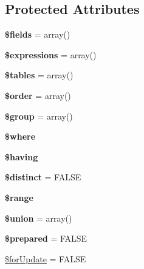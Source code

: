 \subsection*{Protected Attributes}
\begin{DoxyCompactItemize}
\item 
\hypertarget{classSelectQuery_acf123c393af607a777168473e9f4cbcc}{
{\bfseries \$fields} = array()}
\label{classSelectQuery_acf123c393af607a777168473e9f4cbcc}

\item 
\hypertarget{classSelectQuery_ab763e3db3e95a5d2fbea64544b630eac}{
{\bfseries \$expressions} = array()}
\label{classSelectQuery_ab763e3db3e95a5d2fbea64544b630eac}

\item 
\hypertarget{classSelectQuery_a30d0c883c76269fce6d1ad61394affd4}{
{\bfseries \$tables} = array()}
\label{classSelectQuery_a30d0c883c76269fce6d1ad61394affd4}

\item 
\hypertarget{classSelectQuery_a8f8427b3590fe12219b3266e2d729257}{
{\bfseries \$order} = array()}
\label{classSelectQuery_a8f8427b3590fe12219b3266e2d729257}

\item 
\hypertarget{classSelectQuery_aa99dbf66f73eff5b8b98843edbe3de50}{
{\bfseries \$group} = array()}
\label{classSelectQuery_aa99dbf66f73eff5b8b98843edbe3de50}

\item 
\hypertarget{classSelectQuery_a7396f64940a810bfa013e3bed7b97891}{
{\bfseries \$where}}
\label{classSelectQuery_a7396f64940a810bfa013e3bed7b97891}

\item 
\hypertarget{classSelectQuery_afbc6814498bc1a7de2837f904ccf1685}{
{\bfseries \$having}}
\label{classSelectQuery_afbc6814498bc1a7de2837f904ccf1685}

\item 
\hypertarget{classSelectQuery_a06f4f274e48265a9cd4cb4746ca570df}{
{\bfseries \$distinct} = FALSE}
\label{classSelectQuery_a06f4f274e48265a9cd4cb4746ca570df}

\item 
\hypertarget{classSelectQuery_a75ed5f6ced378323afc0ee3f302ccad6}{
{\bfseries \$range}}
\label{classSelectQuery_a75ed5f6ced378323afc0ee3f302ccad6}

\item 
\hypertarget{classSelectQuery_a9375257c9b83ca0c166abc9ba2920b9d}{
{\bfseries \$union} = array()}
\label{classSelectQuery_a9375257c9b83ca0c166abc9ba2920b9d}

\item 
\hypertarget{classSelectQuery_a765c1857e9cc6d50930acafa1cb6cccc}{
{\bfseries \$prepared} = FALSE}
\label{classSelectQuery_a765c1857e9cc6d50930acafa1cb6cccc}

\item 
\hyperlink{classSelectQuery_a72a385abf2fbe4143df62f616af655af}{\$forUpdate} = FALSE
\end{DoxyCompactItemize}


